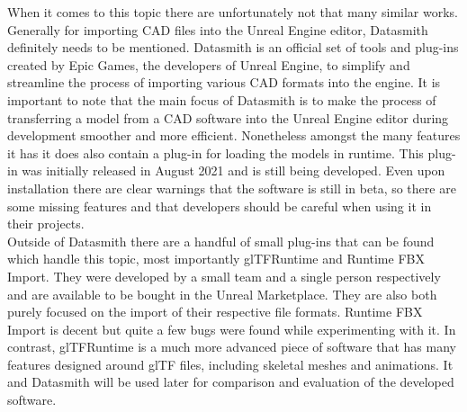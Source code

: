 When it comes to this topic there are unfortunately not that many similar works. Generally for importing \acs{CAD} files into the Unreal Engine editor, Datasmith definitely needs to be mentioned. Datasmith is an official set of tools and plug-ins created by Epic Games, the developers of Unreal Engine, to simplify and streamline the process of importing various \acs{CAD} formats into the engine\cite{bib:DSDoc}. It is important to note that the main focus of Datasmith is to make the process of transferring a model from a \acs{CAD} software into the Unreal Engine editor during development smoother and more efficient. Nonetheless amongst the many features it has it does also contain a plug-in for loading the models in runtime\cite{bib:DSRunDoc}. This plug-in was initially released in August 2021 and is still being developed. Even upon installation there are clear warnings that the software is still in beta, so there are some missing features and that developers should be careful when using it in their projects.\\
Outside of Datasmith there are a handful of small plug-ins that can be found which handle this topic, most importantly glTFRuntime\cite{bib:glTFRun} and Runtime FBX Import\cite{bib:FBXRun}. They were developed by a small team and a single person respectively and are available to be bought in the Unreal Marketplace. They are also both purely focused on the import of their respective file formats. Runtime \acs{FBX} Import is decent but quite a few bugs were found while experimenting with it. In contrast, glTFRuntime is a much more advanced piece of software that has many features designed around \acs{glTF} files, including skeletal meshes and animations. It and Datasmith will be used later for comparison and evaluation of the developed software.